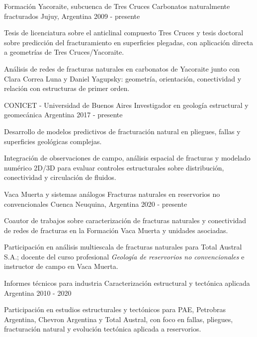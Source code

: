\documentclass[10pt, a4paper]{awesome-cv}
\begin{document}
\begin{cventries}

\cventry
  {Formación Yacoraite, subcuenca de Tres Cruces}
  {Carbonatos naturalmente fracturados}
  {Jujuy, Argentina}
  {2009 - presente}
  {
    \begin{cvitems}
      \item {Tesis de licenciatura sobre el anticlinal compuesto Tres Cruces y tesis doctoral sobre predicción del fracturamiento en superficies plegadas, con aplicación directa a geometrías de Tres Cruces/Yacoraite.}
      \item {Análisis de redes de fracturas naturales en carbonatos de Yacoraite junto con Clara Correa Luna y Daniel Yagupsky: geometría, orientación, conectividad y relación con estructuras de primer orden.}
    \end{cvitems}
  }

\cventry
  {CONICET - Universidad de Buenos Aires}
  {Investigador en geología estructural y geomecánica}
  {Argentina}
  {2017 - presente}
  {
    \begin{cvitems}
      \item {Desarrollo de modelos predictivos de fracturación natural en pliegues, fallas y superficies geológicas complejas.}
      \item {Integración de observaciones de campo, análisis espacial de fracturas y modelado numérico 2D/3D para evaluar controles estructurales sobre distribución, conectividad y circulación de fluidos.}
    \end{cvitems}
  }

\cventry
  {Vaca Muerta y sistemas análogos}
  {Fracturas naturales en reservorios no convencionales}
  {Cuenca Neuquina, Argentina}
  {2020 - presente}
  {
    \begin{cvitems}
      \item {Coautor de trabajos sobre caracterización de fracturas naturales y conectividad de redes de fracturas en la Formación Vaca Muerta y unidades asociadas.}
      \item {Participación en análisis multiescala de fracturas naturales para Total Austral S.A.; docente del curso profesional \emph{Geología de reservorios no convencionales} e instructor de campo en Vaca Muerta.}
    \end{cvitems}
  }

\cventry
  {Informes técnicos para industria}
  {Caracterización estructural y tectónica aplicada}
  {Argentina}
  {2010 - 2020}
  {
    \begin{cvitems}
      \item {Participación en estudios estructurales y tectónicos para PAE, Petrobras Argentina, Chevron Argentina y Total Austral, con foco en fallas, pliegues, fracturación natural y evolución tectónica aplicada a reservorios.}
    \end{cvitems}
  }

\end{cventries}
\end{document}
